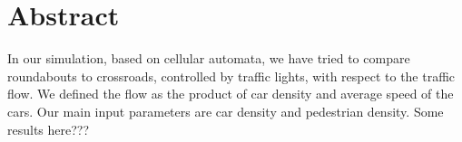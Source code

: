 \section{Abstract}
In our simulation, based on cellular automata, we have tried to compare roundabouts to crossroads, controlled by traffic lights, with respect to the traffic flow. We defined the flow as the product of car density and average speed of the cars. Our main input parameters are car density and pedestrian density. 
Some results here???